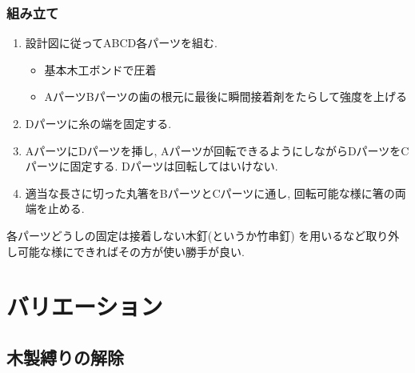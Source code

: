\documentclass{jarticle}
\begin{document}
\subsubsection{組み立て}
\begin{enumerate}
\item
	設計図に従ってABCD各パーツを組む.
	\begin{itemize}
	\item 基本木工ボンドで圧着
	\item AパーツBパーツの歯の根元に最後に瞬間接着剤をたらして強度を上げる
	\end{itemize}
\item
	Dパーツに糸の端を固定する.
\item
	AパーツにDパーツを挿し, Aパーツが回転できるようにしながらDパーツをCパーツに固定する.
	Dパーツは回転してはいけない.
\item
	適当な長さに切った丸箸をBパーツとCパーツに通し,
	回転可能な様に箸の両端を止める.
\end{enumerate}
各パーツどうしの固定は接着しない木釘(というか竹串釘)
を用いるなど取り外し可能な様にできればその方が使い勝手が良い.


\section{バリエーション}
\subsection{木製縛りの解除}
\end{document}
